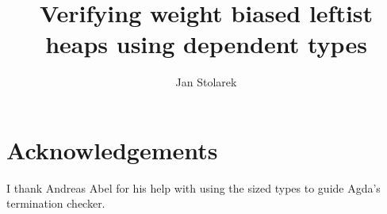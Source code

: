 \documentclass{llncs}
\begin{document}
\title{Verifying weight biased leftist heaps using dependent types}
\author{Jan Stolarek}



\maketitle







\section*{Acknowledgements}

I thank Andreas Abel for his help with using the sized types to guide Agda's termination checker.


\end{document}
